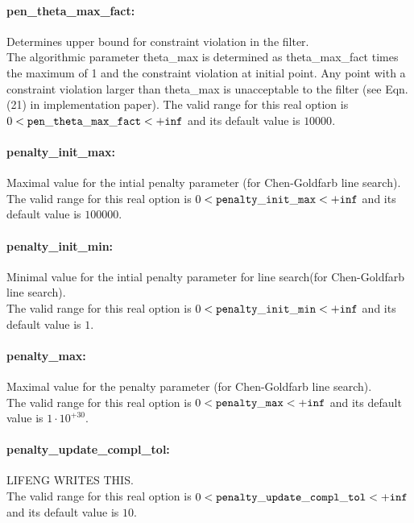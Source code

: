 \paragraph{pen\_theta\_max\_fact:}\label{sec:pen_theta_max_fact} Determines upper bound for constraint violation in the filter. $\;$ \\
 The algorithmic parameter theta\_max is
determined as theta\_max\_fact times the maximum
of 1 and the constraint violation at initial
point.  Any point with a constraint violation
larger than theta\_max is unacceptable to the
filter (see Eqn. (21) in implementation paper). The valid range for this real option is 
$0 <  {\tt pen\_theta\_max\_fact } <  {\tt +inf}$
and its default value is $10000$.


\paragraph{penalty\_init\_max:}\label{sec:penalty_init_max} Maximal value for the intial penalty parameter (for Chen-Goldfarb line search). $\;$ \\
 The valid range for this real option is 
$0 <  {\tt penalty\_init\_max } <  {\tt +inf}$
and its default value is $100000$.


\paragraph{penalty\_init\_min:}\label{sec:penalty_init_min} Minimal value for the intial penalty parameter for line search(for Chen-Goldfarb line search). $\;$ \\
 The valid range for this real option is 
$0 <  {\tt penalty\_init\_min } <  {\tt +inf}$
and its default value is $1$.


\paragraph{penalty\_max:}\label{sec:penalty_max} Maximal value for the penalty parameter (for Chen-Goldfarb line search). $\;$ \\
 The valid range for this real option is 
$0 <  {\tt penalty\_max } <  {\tt +inf}$
and its default value is $1 \cdot 10^{+30}$.


\paragraph{penalty\_update\_compl\_tol:}\label{sec:penalty_update_compl_tol} LIFENG WRITES THIS. $\;$ \\
 The valid range for this real option is 
$0 <  {\tt penalty\_update\_compl\_tol } <  {\tt +inf}$
and its default value is $10$.


